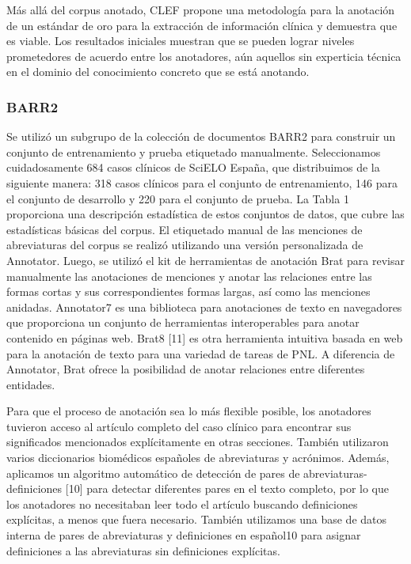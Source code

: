Más allá del corpus anotado, CLEF propone una metodología para la anotación de un estándar de oro para la extracción de información clínica y demuestra que es viable.
Los resultados iniciales muestran que se pueden lograr niveles prometedores de acuerdo entre los anotadores, aún aquellos sin experticia técnica en el dominio del conocimiento concreto que se está anotando.

\subsubsection*{BARR2}

Se utilizó un subgrupo de la colección de documentos BARR2 para construir un conjunto de entrenamiento y prueba etiquetado manualmente. Seleccionamos cuidadosamente 684 casos clínicos de SciELO España, que distribuimos de la siguiente manera: 318 casos clínicos para el conjunto de entrenamiento, 146 para el conjunto de desarrollo y 220 para el conjunto de prueba. La Tabla 1 proporciona una descripción estadística de estos conjuntos de datos, que cubre las estadísticas básicas del corpus. El etiquetado manual de las menciones de abreviaturas del corpus se realizó utilizando una versión personalizada de Annotator. Luego, se utilizó el kit de herramientas de anotación Brat para revisar manualmente las anotaciones de menciones y anotar las relaciones entre las formas cortas y sus correspondientes formas largas, así como las menciones anidadas. Annotator7 es una biblioteca para anotaciones de texto en navegadores que proporciona un conjunto de herramientas interoperables para anotar contenido en páginas web. Brat8 [11] es otra herramienta intuitiva basada en web para la anotación de texto para una variedad de tareas de PNL. A diferencia de Annotator, Brat ofrece la posibilidad de anotar relaciones entre diferentes entidades.

Para que el proceso de anotación sea lo más flexible posible, los anotadores tuvieron acceso al artículo completo del caso clínico para encontrar sus significados mencionados explícitamente en otras secciones. También utilizaron varios diccionarios biomédicos españoles de abreviaturas y acrónimos. Además, aplicamos un algoritmo automático de detección de pares de abreviaturas-definiciones [10] para detectar diferentes pares en el texto completo, por lo que los anotadores no necesitaban leer todo el artículo buscando definiciones explícitas, a menos que fuera necesario. También utilizamos una base de datos interna de pares de abreviaturas y definiciones en español10 para asignar definiciones a las abreviaturas sin definiciones explícitas.

